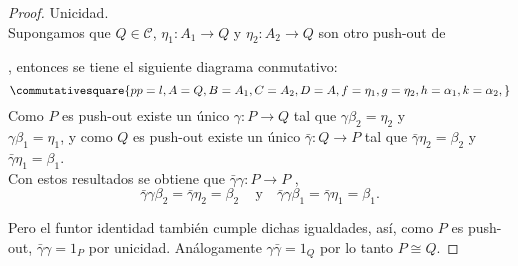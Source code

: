 \documentclass{article}
\begin{document}
\begin{enumerate}[label=\textbf{Ej \arabic*.}]
\begin{proof}
Unicidad.\\
Supongamos que $Q\in \mathscr{C}$, $\eta_1\colon A_1\longrightarrow Q$\,\,y\,\,$\eta_2\colon A_2\longrightarrow Q$ son otro push-out de 
  , entonces se tiene el siguiente diagrama conmutativo:
 \begin{equation*}
\commutativesquare{pp=l,A=Q,B=A_1,C=A_2,D=A, f=\eta_1,g=\eta_2,h=\alpha_1,k=\alpha_2,}
\end{equation*}	
Como $P$ es push-out existe un único $\gamma\colon P\longrightarrow Q$ tal que $\gamma\beta_2=\eta_2$\,\,y\\$\gamma\beta_1=\eta_1$,
y como $Q$ es push-out existe un único $\bar{\gamma}\colon Q\longrightarrow P$ tal que $\bar{\gamma}\eta_2=\beta_2$\,\,y
\,\,$\bar{\gamma}\eta_1=\beta_1$.\\
Con estos resultados se obtiene que $\bar{\gamma}\gamma\colon P\longrightarrow P$\,\,,
\[\bar{\gamma}\gamma\beta_2=\bar{\gamma}\eta_2=\beta_2\,\quad \text{y}\quad \bar{\gamma}\gamma\beta_1=\bar{\gamma}\eta_1=\beta_1.
\]

Pero el funtor identidad también cumple dichas igualdades, así, como $P$ es push-out, $\bar{\gamma}\gamma=1_P$ por unicidad. Análogamente
$\gamma\bar{\gamma}=1_Q$ por lo tanto $P\cong Q$.
\end{proof}


\end{enumerate}
\end{document}
